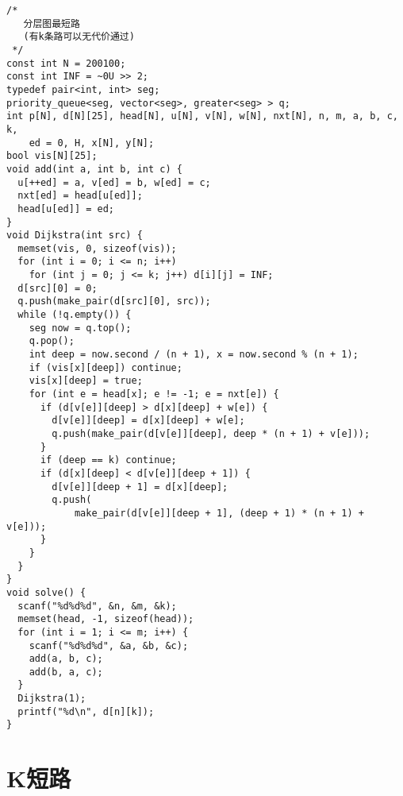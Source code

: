\begin{lstlisting}
/*
   分层图最短路
   (有k条路可以无代价通过)
 */
const int N = 200100;
const int INF = ~0U >> 2;
typedef pair<int, int> seg;
priority_queue<seg, vector<seg>, greater<seg> > q;
int p[N], d[N][25], head[N], u[N], v[N], w[N], nxt[N], n, m, a, b, c, k,
    ed = 0, H, x[N], y[N];
bool vis[N][25];
void add(int a, int b, int c) {
  u[++ed] = a, v[ed] = b, w[ed] = c;
  nxt[ed] = head[u[ed]];
  head[u[ed]] = ed;
}
void Dijkstra(int src) {
  memset(vis, 0, sizeof(vis));
  for (int i = 0; i <= n; i++)
    for (int j = 0; j <= k; j++) d[i][j] = INF;
  d[src][0] = 0;
  q.push(make_pair(d[src][0], src));
  while (!q.empty()) {
    seg now = q.top();
    q.pop();
    int deep = now.second / (n + 1), x = now.second % (n + 1);
    if (vis[x][deep]) continue;
    vis[x][deep] = true;
    for (int e = head[x]; e != -1; e = nxt[e]) {
      if (d[v[e]][deep] > d[x][deep] + w[e]) {
        d[v[e]][deep] = d[x][deep] + w[e];
        q.push(make_pair(d[v[e]][deep], deep * (n + 1) + v[e]));
      }
      if (deep == k) continue;
      if (d[x][deep] < d[v[e]][deep + 1]) {
        d[v[e]][deep + 1] = d[x][deep];
        q.push(
            make_pair(d[v[e]][deep + 1], (deep + 1) * (n + 1) + v[e]));
      }
    }
  }
}
void solve() {
  scanf("%d%d%d", &n, &m, &k);
  memset(head, -1, sizeof(head));
  for (int i = 1; i <= m; i++) {
    scanf("%d%d%d", &a, &b, &c);
    add(a, b, c);
    add(b, a, c);
  }
  Dijkstra(1);
  printf("%d\n", d[n][k]);
}

\end{lstlisting}

\section{K短路}

